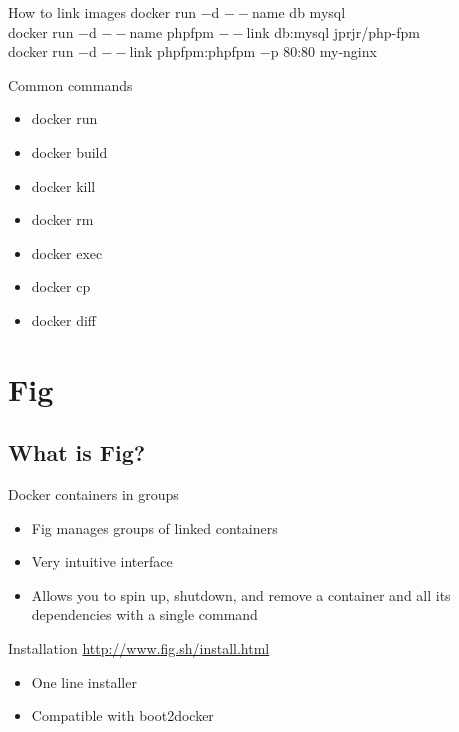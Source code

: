 \documentclass{beamer}
\begin{document}
    \begin{frame}{How to link images}
        docker run $-$d \alert<2>{$--$name db} mysql\\
        docker run $-$d \alert<3>{$--$name phpfpm} $--$link \alert<2>{db}:mysql jprjr/php-fpm\\
        docker run $-$d $--$link \alert<3>{phpfpm}:phpfpm $-$p 80:80 my-nginx\\
    \end{frame}
    \begin{frame}{Common commands}
        \begin{itemize}
            \item docker run
            \item docker build
            \item docker kill
            \item docker rm
            \item docker exec
            \item docker cp
            \item docker diff
        \end{itemize}
    \end{frame}
    \section{Fig}
    \subsection{What is Fig?}
    \begin{frame}{Docker containers in groups}
        \begin{itemize}
            \item Fig manages groups of linked containers
            \item Very intuitive interface
            \item Allows you to spin up, shutdown, and remove a container and all its dependencies with a single command
        \end{itemize}
    \end{frame}
    \begin{frame}{Installation}
        \href{http://www.fig.sh/install.html}{http://www.fig.sh/install.html}
        \begin{itemize}
            \item One line installer
            \item Compatible with boot2docker
        \end{itemize}
    \end{frame}
\end{document}
